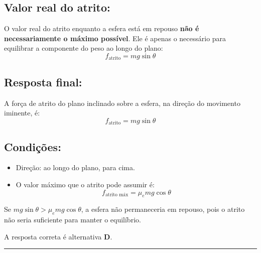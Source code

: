 \begin{flushleft}
\subsection*{Valor real do atrito:}

O valor real do atrito enquanto a esfera está em repouso \textbf{não é necessariamente o máximo possível}.  
Ele é apenas o necessário para equilibrar a componente do peso ao longo do plano:
\begin{equation*}
  f_{\text{atrito}} = mg \sin\theta
\end{equation*}

\subsection*{Resposta final:}

A força de atrito do plano inclinado sobre a esfera, na direção do movimento iminente, é:
\begin{equation*}
  \boxed{f_{\text{atrito}} = mg \sin\theta}
\end{equation*}

\subsection*{Condições:}

\begin{itemize}
  \item Direção: ao longo do plano, para cima.
  \item O valor máximo que o atrito pode assumir é:
  \begin{equation*}
    f_{\text{atrito máx}} = \mu_e mg \cos\theta
  \end{equation*}
\end{itemize}

Se \( mg\sin\theta > \mu_e mg\cos\theta \), a esfera não permaneceria em repouso, pois o atrito não seria suficiente para manter o equilíbrio.

A resposta correta é alternativa \colorbox{green!50}{\textbf{D}}.

\end{flushleft}

\noindent\rule{\linewidth}{0.6pt}\\

